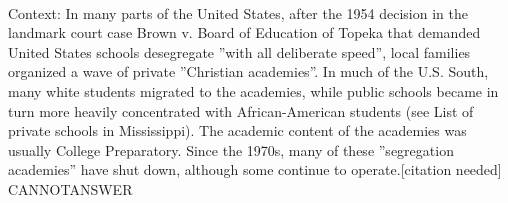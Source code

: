 \documentclass[11pt,a4paper, onecolumn]{article}
\begin{document}
\\ Context: In many parts of the United States, after the 1954 decision in the landmark court case Brown v. Board of Education of Topeka that demanded United States schools desegregate ''with all deliberate speed'', local families organized a wave of private ''Christian academies''. In much of the U.S. South, many white students migrated to the academies, while public schools became in turn more heavily concentrated with African-American students (see List of private schools in Mississippi). The academic content of the academies was usually College Preparatory. Since the 1970s, many of these ''segregation academies'' have shut down, although some continue to operate.[citation needed] CANNOTANSWER
\end{document}
